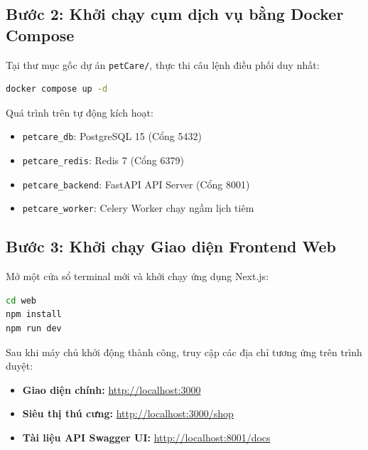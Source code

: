 \subsection{Bước 2: Khởi chạy cụm dịch vụ bằng Docker Compose}
Tại thư mục gốc dự án \texttt{petCare/}, thực thi câu lệnh điều phối duy nhất:
\begin{lstlisting}[language=bash, caption={Khởi chạy hệ thống 4 dịch vụ container}]
docker compose up -d
\end{lstlisting}
Quá trình trên tự động kích hoạt:
\begin{itemize}
    \item \texttt{petcare\_db}: PostgreSQL 15 (Cổng 5432)
    \item \texttt{petcare\_redis}: Redis 7 (Cổng 6379)
    \item \texttt{petcare\_backend}: FastAPI API Server (Cổng 8001)
    \item \texttt{petcare\_worker}: Celery Worker chạy ngầm lịch tiêm
\end{itemize}

\subsection{Bước 3: Khởi chạy Giao diện Frontend Web}
Mở một cửa sổ terminal mới và khởi chạy ứng dụng Next.js:
\begin{lstlisting}[language=bash, caption={Cài đặt gói và khởi chạy Next.js dev server}]
cd web
npm install
npm run dev
\end{lstlisting}

Sau khi máy chủ khởi động thành công, truy cập các địa chỉ tương ứng trên trình duyệt:
\begin{itemize}[leftmargin=1.5cm]
    \item \textbf{Giao diện chính:} \url{http://localhost:3000}
    \item \textbf{Siêu thị thú cưng:} \url{http://localhost:3000/shop}
    \item \textbf{Tài liệu API Swagger UI:} \url{http://localhost:8001/docs}
\end{itemize}
